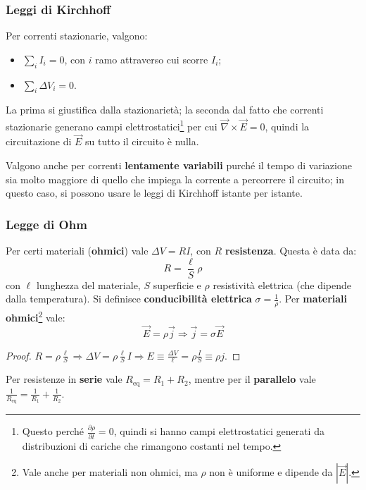 \documentclass[a4paper]{scrartcl}
\numberwithin{equation}{subsection}
\theoremstyle{style1}
\newenvironment{boxenv}[1][]{
    \begin{eqbox}[#1]
    }{
   \end{eqbox}
}
\begin{document}
\subsubsection{Leggi di Kirchhoff}
Per correnti stazionarie, valgono:
\begin{itemize}
	\item $\sum_{i}^{} I_i = 0$, con $i$ ramo attraverso cui scorre $I_i$;
	\item $\sum_{i}^{} \Delta V_i = 0$.
\end{itemize}
La prima si giustifica dalla stazionariet\`a; la seconda dal fatto che correnti stazionarie generano campi elettrostatici\footnote{Questo perch\'e $\frac{\partial \rho }{\partial t} = 0 $, quindi si hanno campi elettrostatici generati da distribuzioni di cariche che rimangono costanti nel tempo.} per cui $\vec{\nabla }\times \vec{E}=0$, quindi la circuitazione di $\vec{E}$ su tutto il circuito \`e nulla.

Valgono anche per correnti \textbf{lentamente variabili} purch\'e il tempo di variazione sia molto maggiore di quello che impiega la corrente a percorrere il circuito; in questo caso, si possono usare le leggi di Kirchhoff istante per istante.

\subsubsection{Legge di Ohm}

Per certi materiali (\textbf{ohmici}) vale $\Delta V = R I$, con $R$ \textbf{resistenza}. Questa \`e data da:
\begin{equation}
	R = \frac{\ell }{S} \rho 
\end{equation}
con $\ell $ lunghezza del materiale, $S$ superficie e $\rho $ resistivit\`a elettrica (che dipende dalla temperatura). Si definisce \textbf{conducibilit\`a elettrica} $\sigma  = \frac{1}{\rho }$. Per \textbf{materiali ohmici}\footnote{Vale anche per materiali non ohmici, ma $\rho $ non \`e uniforme e dipende da $\left\lvert \vec{E} \right\rvert $.} vale:
\begin{equation}
	\vec{E} = \rho  \vec{j} \Rightarrow \vec{j} = \sigma  \vec{E}
\end{equation}
\begin{boxenv}[]
\begin{proof}
	$R= \rho  \frac{\ell }{S}\Rightarrow \Delta V = \rho  \frac{\ell }{S}I\Rightarrow E \equiv \frac{\Delta V}{\ell }= \rho \frac{I}{S}\equiv \rho  j$.  
\end{proof}
\end{boxenv}
\noindent Per resistenze in \textbf{serie} vale $R_\text{eq} = R_1+R_2$, mentre per il \textbf{parallelo} vale $\frac{1}{R_\text{eq} }= \frac{1}{R_1}+\frac{1}{R_2}$.
\end{document}
